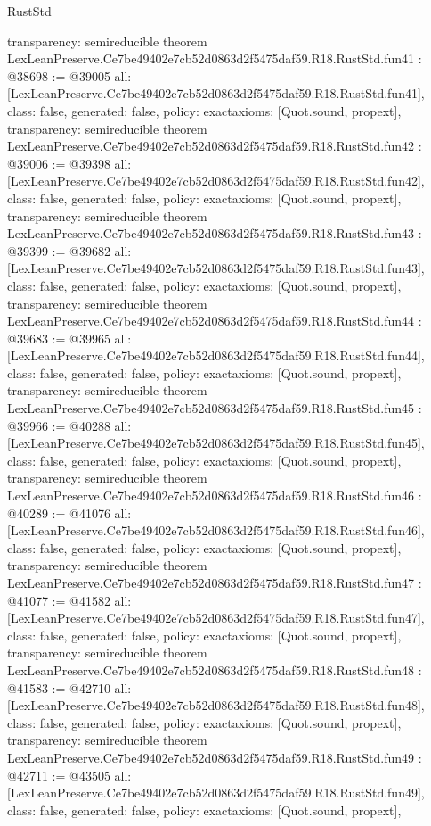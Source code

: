 \begin{lexlean}{RustStd}
\begin{coremodule}
{  transparency: semireducible
}
theorem LexLeanPreserve.Ce7be49402e7cb52d0863d2f5475daf59.R18.RustStd.fun41 : @38698 := @39005 {
  all: [LexLeanPreserve.Ce7be49402e7cb52d0863d2f5475daf59.R18.RustStd.fun41],
  class: false,
  generated: false,
  policy: exact{axioms: [Quot.sound, propext]},
  transparency: semireducible
}
theorem LexLeanPreserve.Ce7be49402e7cb52d0863d2f5475daf59.R18.RustStd.fun42 : @39006 := @39398 {
  all: [LexLeanPreserve.Ce7be49402e7cb52d0863d2f5475daf59.R18.RustStd.fun42],
  class: false,
  generated: false,
  policy: exact{axioms: [Quot.sound, propext]},
  transparency: semireducible
}
theorem LexLeanPreserve.Ce7be49402e7cb52d0863d2f5475daf59.R18.RustStd.fun43 : @39399 := @39682 {
  all: [LexLeanPreserve.Ce7be49402e7cb52d0863d2f5475daf59.R18.RustStd.fun43],
  class: false,
  generated: false,
  policy: exact{axioms: [Quot.sound, propext]},
  transparency: semireducible
}
theorem LexLeanPreserve.Ce7be49402e7cb52d0863d2f5475daf59.R18.RustStd.fun44 : @39683 := @39965 {
  all: [LexLeanPreserve.Ce7be49402e7cb52d0863d2f5475daf59.R18.RustStd.fun44],
  class: false,
  generated: false,
  policy: exact{axioms: [Quot.sound, propext]},
  transparency: semireducible
}
theorem LexLeanPreserve.Ce7be49402e7cb52d0863d2f5475daf59.R18.RustStd.fun45 : @39966 := @40288 {
  all: [LexLeanPreserve.Ce7be49402e7cb52d0863d2f5475daf59.R18.RustStd.fun45],
  class: false,
  generated: false,
  policy: exact{axioms: [Quot.sound, propext]},
  transparency: semireducible
}
theorem LexLeanPreserve.Ce7be49402e7cb52d0863d2f5475daf59.R18.RustStd.fun46 : @40289 := @41076 {
  all: [LexLeanPreserve.Ce7be49402e7cb52d0863d2f5475daf59.R18.RustStd.fun46],
  class: false,
  generated: false,
  policy: exact{axioms: [Quot.sound, propext]},
  transparency: semireducible
}
theorem LexLeanPreserve.Ce7be49402e7cb52d0863d2f5475daf59.R18.RustStd.fun47 : @41077 := @41582 {
  all: [LexLeanPreserve.Ce7be49402e7cb52d0863d2f5475daf59.R18.RustStd.fun47],
  class: false,
  generated: false,
  policy: exact{axioms: [Quot.sound, propext]},
  transparency: semireducible
}
theorem LexLeanPreserve.Ce7be49402e7cb52d0863d2f5475daf59.R18.RustStd.fun48 : @41583 := @42710 {
  all: [LexLeanPreserve.Ce7be49402e7cb52d0863d2f5475daf59.R18.RustStd.fun48],
  class: false,
  generated: false,
  policy: exact{axioms: [Quot.sound, propext]},
  transparency: semireducible
}
theorem LexLeanPreserve.Ce7be49402e7cb52d0863d2f5475daf59.R18.RustStd.fun49 : @42711 := @43505 {
  all: [LexLeanPreserve.Ce7be49402e7cb52d0863d2f5475daf59.R18.RustStd.fun49],
  class: false,
  generated: false,
  policy: exact{axioms: [Quot.sound, propext]},
}
\end{coremodule}
\end{lexlean}

